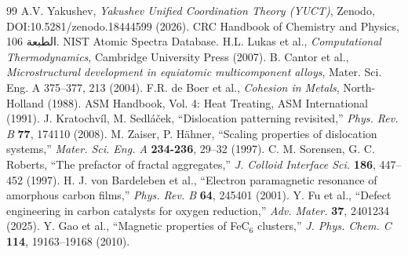 \documentclass[11pt,a4paper]{article}
\begin{document}
\begin{otherlanguage}{arabic}
		\begin{thebibliography}{99}
			 A.V. Yakushev, \emph{Yakushev Unified Coordination Theory (YUCT)}, Zenodo, DOI:10.5281/zenodo.18444599 (2026).
			 CRC Handbook of Chemistry and Physics, الطبعة 106.
			 NIST Atomic Spectra Database.
			 H.L. Lukas et al., \emph{Computational Thermodynamics}, Cambridge University Press (2007).
			 B. Cantor et al., \emph{Microstructural development in equiatomic multicomponent alloys}, Mater. Sci. Eng. A 375–377, 213 (2004).
			 F.R. de Boer et al., \emph{Cohesion in Metals}, North-Holland (1988).
			 ASM Handbook, Vol. 4: Heat Treating, ASM International (1991).
			 J. Kratochv\'il, M. Sedl\'a\v{c}ek, ``Dislocation patterning revisited,'' \emph{Phys. Rev. B} \textbf{77}, 174110 (2008).
			 M. Zaiser, P. H\"ahner, ``Scaling properties of dislocation systems,'' \emph{Mater. Sci. Eng. A} \textbf{234-236}, 29–32 (1997).
			 C. M. Sorensen, G. C. Roberts, ``The prefactor of fractal aggregates,'' \emph{J. Colloid Interface Sci.} \textbf{186}, 447–452 (1997).
			 H. J. von Bardeleben et al., ``Electron paramagnetic resonance of amorphous carbon films,'' \emph{Phys. Rev. B} \textbf{64}, 245401 (2001).
			 Y. Fu et al., ``Defect engineering in carbon catalysts for oxygen reduction,'' \emph{Adv. Mater.} \textbf{37}, 2401234 (2025).
			 Y. Gao et al., ``Magnetic properties of FeC$_6$ clusters,'' \emph{J. Phys. Chem. C} \textbf{114}, 19163–19168 (2010).
		\end{thebibliography}
		
	\end{otherlanguage}
	
	
	
\end{document}
